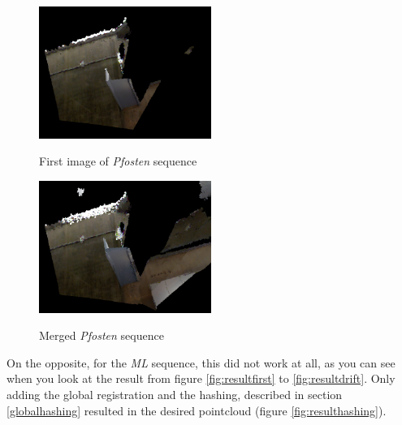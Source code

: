\documentclass[10pt,twocolumn,letterpaper]{article}
\begin{document}
\begin{figure}
  \includegraphics[width=0.5\textwidth]{pfostenstart}
  \label{fig:pfostenstart}
  \caption{First image of \textit{Pfosten} sequence}
\end{figure}

\begin{figure}
  \includegraphics[width=0.5\textwidth]{pfostenend}
  \label{fig:pfostenend}
  \caption{Merged \textit{Pfosten} sequence}
\end{figure}

On the opposite, for the \textit{ML} sequence, this did not work at all, as you can see when you look at the result from figure
\ref{fig:resultfirst} to \ref{fig:resultdrift}. Only adding the global registration and the hashing, described in section \ref{globalhashing}
resulted in the desired pointcloud (figure \ref{fig:resulthashing}).
\end{document}
